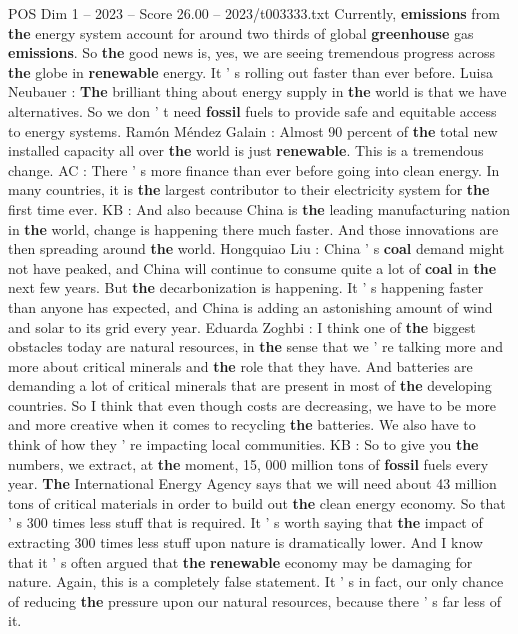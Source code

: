 \begin{textsample}{POS Dim 1 – 2023 – Score 26.00 – 2023/t003333.txt}
Currently, \textbf{emissions} from \textbf{the} energy system account for around two thirds of global \textbf{greenhouse} gas \textbf{emissions}.
So \textbf{the} good news is, yes, we are seeing tremendous progress across \textbf{the} globe in \textbf{renewable} energy.
It ' s rolling out faster than ever before.
Luisa Neubauer : \textbf{The} brilliant thing about energy supply in \textbf{the} world is that we have alternatives.
So we don ' t need \textbf{fossil} fuels to provide safe and equitable access to energy systems.
Ramón Méndez Galain : Almost 90 percent of \textbf{the} total new installed capacity all over \textbf{the} world is just \textbf{renewable}.
This is a tremendous change.
AC : There ' s more finance than ever before going into clean energy.
In many countries, it is \textbf{the} largest contributor to their electricity system for \textbf{the} first time ever.
KB : And also because China is \textbf{the} leading manufacturing nation in \textbf{the} world, change is happening there much faster.
And those innovations are then spreading around \textbf{the} world.
Hongquiao Liu : China ' s \textbf{coal} demand might not have peaked, and China will continue to consume quite a lot of \textbf{coal} in \textbf{the} next few years.
But \textbf{the} decarbonization is happening.
It ' s happening faster than anyone has expected, and China is adding an astonishing amount of wind and solar to its grid every year.
Eduarda Zoghbi : I think one of \textbf{the} biggest obstacles today are natural resources, in \textbf{the} sense that we ' re talking more and more about critical minerals and \textbf{the} role that they have.
And batteries are demanding a lot of critical minerals that are present in most of \textbf{the} developing countries.
So I think that even though costs are decreasing, we have to be more and more creative when it comes to recycling \textbf{the} batteries.
We also have to think of how they ' re impacting local communities.
KB : So to give you \textbf{the} numbers, we extract, at \textbf{the} moment, 15, 000 million tons of \textbf{fossil} fuels every year. \textbf{The} International Energy Agency says that we will need about 43 million tons of critical materials in order to build out \textbf{the} clean energy economy.
So that ' s 300 times less stuff that is required.
It ' s worth saying that \textbf{the} impact of extracting 300 times less stuff upon nature is dramatically lower.
And I know that it ' s often argued that \textbf{the} \textbf{renewable} economy may be damaging for nature.
Again, this is a completely false statement.
It ' s in fact, our only chance of reducing \textbf{the} pressure upon our natural resources, because there ' s far less of it.

\end{textsample}
